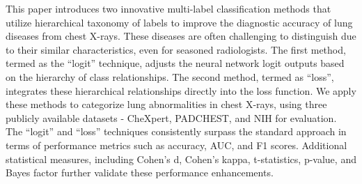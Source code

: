 This paper introduces two innovative multi-label classification methods that utilize hierarchical taxonomy of labels to improve the diagnostic accuracy of lung diseases from chest X-rays. These diseases are often challenging to distinguish due to their similar characteristics, even for seasoned radiologists. The first method, termed as the ``logit'' technique, adjusts the neural network logit outputs based on the hierarchy of class relationships. The second method, termed as ``loss'', integrates these hierarchical relationships directly into the loss function. We apply these methods to categorize lung abnormalities in chest X-rays, using three publicly available datasets - CheXpert, PADCHEST, and NIH for evaluation. The ``logit'' and ``loss'' techniques consistently surpass the standard approach in terms of performance metrics such as accuracy, AUC, and F1 scores. Additional statistical measures, including Cohen's d, Cohen's kappa, t-statistics, p-value, and Bayes factor further validate these performance enhancements.
